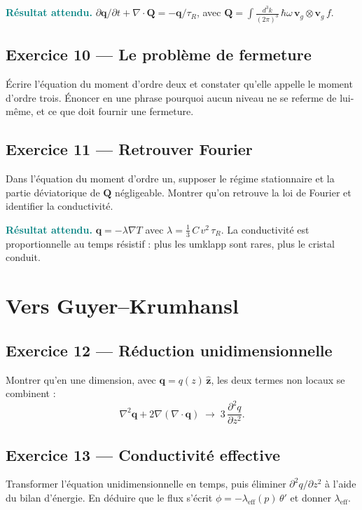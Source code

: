 \documentclass[11pt,a4paper]{article}
\newcommand{\rep}[1]{\par\smallskip\noindent\textcolor{teal}{\textbf{Résultat attendu.}}\; #1\par\smallskip}
\begin{document}
\rep{$\partial\mathbf{q}/\partial t + \nabla\cdot\mathbf{Q} = -\mathbf{q}/\tau_R$, avec
$\mathbf{Q} = \int \frac{d^3k}{(2\pi)^3}\,\hbar\omega\,\mathbf{v}_g \otimes \mathbf{v}_g\,f$.}

\subsection*{Exercice 10 --- Le problème de fermeture}

Écrire l'équation du moment d'ordre deux et constater qu'elle appelle le moment d'ordre trois.
Énoncer en une phrase pourquoi aucun niveau ne se referme de lui-même, et ce que doit fournir une
fermeture.

\subsection*{Exercice 11 --- Retrouver Fourier}

Dans l'équation du moment d'ordre un, supposer le régime stationnaire et la partie déviatorique de
$\mathbf{Q}$ négligeable. Montrer qu'on retrouve la loi de Fourier et identifier la conductivité.

\rep{$\mathbf{q} = -\lambda\nabla T$ avec $\lambda = \tfrac{1}{3}\,C\,v^2\,\tau_R$. La conductivité
est proportionnelle au temps résistif : plus les umklapp sont rares, plus le cristal conduit.}

\section{Vers Guyer--Krumhansl}

\subsection*{Exercice 12 --- Réduction unidimensionnelle}

Montrer qu'en une dimension, avec $\mathbf{q} = q(z)\,\hat{\mathbf{z}}$, les deux termes non locaux
se combinent :
\[ \nabla^2\mathbf{q} + 2\nabla(\nabla\cdot\mathbf{q}) \;\longrightarrow\;
3\,\frac{\partial^2 q}{\partial z^2} . \]

\subsection*{Exercice 13 --- Conductivité effective}

Transformer l'équation unidimensionnelle en temps, puis éliminer $\partial^2 q/\partial z^2$ à
l'aide du bilan d'énergie. En déduire que le flux s'écrit $\phi = -\lambda_{\mathrm{eff}}(p)\,\theta'$
et donner $\lambda_{\mathrm{eff}}$.
\end{document}
